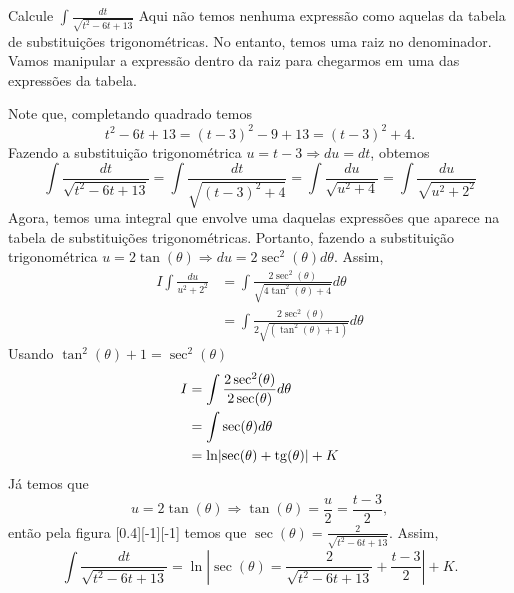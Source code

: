 \begin{example}
  Calcule \(\int \frac{dt}{\sqrt{t^2-6t+13}}\)
  \solution
  Aqui não temos nenhuma expressão como aquelas da tabela de
  substituições trigonométricas. No entanto, temos uma raiz no denominador.
  Vamos manipular a expressão dentro da raiz para chegarmos em uma das
  expressões da tabela.

  Note que, completando quadrado temos
  \[
    t^2-6t+13
    =(t-3)^2-9+13
    =(t-3)^2+4.
  \]
  Fazendo a substituição trigonométrica $u=t-3 \Rightarrow du=dt$, obtemos
  \[
    \int   \frac{dt}{\sqrt{t^2-6t+13}}
    = \int \frac{dt}{\sqrt{(t-3)^2+4}}
    = \int \frac{du}{\sqrt{u^2+4}}
    = \int \frac{du}{\sqrt{u^2+2^2}}
  \]
  Agora, temos uma integral que envolve uma daquelas expressões
  que aparece na tabela de substituições trigonométricas.
  Portanto, fazendo a substituição trigonométrica
  $u=2\tan(\theta) \Rightarrow du=2\sec^2(\theta) d\theta$. Assim,
  \begin{align*}
    I
    \int \frac{du}{u^2+2^2}
    & = \int \frac{2\sec^2(\theta) }{\sqrt{4\tan^2(\theta)+4}}d\theta \\
    & = \int \frac{2\sec^2(\theta) }{2\sqrt{(\tan^2(\theta)+1)}}d\theta
  \end{align*}
  Usando \(\tan^2(\theta)+1= \sec^2(\theta)\)
  \begin{align*}
    I
    & = \int \frac{2\sec^2(\theta)}{2\sec(\theta)}d\theta \\
    & = \int \sec(\theta)d\theta \\
    & = \ln \abs{\sec(\theta)+ \tan(\theta)} + K
  \end{align*}
  Já temos que
  \[
    u=2\tan(\theta) \Rightarrow \tan(\theta)=\frac{u}{2}=\frac{t-3}{2},
  \]
  então pela figura
  [0.4][-1][-1]
  temos que \(\sec(\theta)=\frac{2}{\sqrt{t^2-6t+13}}\). Assim,
  \[
    \int \frac{dt}{\sqrt{t^2-6t+13}}
    = \ln \left|\sec(\theta)
    =\frac{2}{\sqrt{t^2-6t+13}}+ \frac{t-3}{2} \right| +K.
  \]
\end{example}

